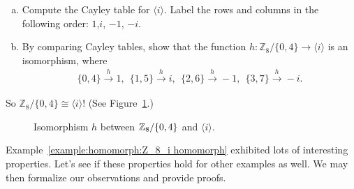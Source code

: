 \begin{exercise}\label{exercise:homomorph:Z8/04_i_iso}
\begin{enumerate}[(a)]
\item
Compute the Cayley table for $\langle i \rangle$. Label the rows and columns in the following order:
$1$,$i$, $-1$,  $-i$. 
\item
By comparing Cayley tables, show that the function $h: {\mathbb Z}_8/\{0,4\} \longrightarrow \langle i \rangle$ is an isomorphism, where 
\begin{align*}
    \{0,4\} \overset{h}{\longrightarrow} 1 ,~~     \{1,5\}  \overset{h}\longrightarrow i,~~    \{2,6\}  \overset{h}\longrightarrow -1,~~   \{3,7\}  \overset{h}\longrightarrow -i.  
\end{align*}
\end{enumerate}
\end{exercise}

So ${\mathbb Z}_8/ \{0,4\} \cong \langle i \rangle$! (See Figure~\ref{fig:homomorph2}.) 

\begin{figure}[htb]
	  \caption{\label{fig:homomorph2} Isomorphism $h$ between $\mathbb{Z}_8/\{0,4\}$ and $\langle i \rangle$. }
\end{figure}

Example~\ref{example:homomorph:Z_8_i homomorph} exhibited lots of interesting properties. Let's see if these properties hold for other examples as well. We may  then formalize our observations and provide proofs.

